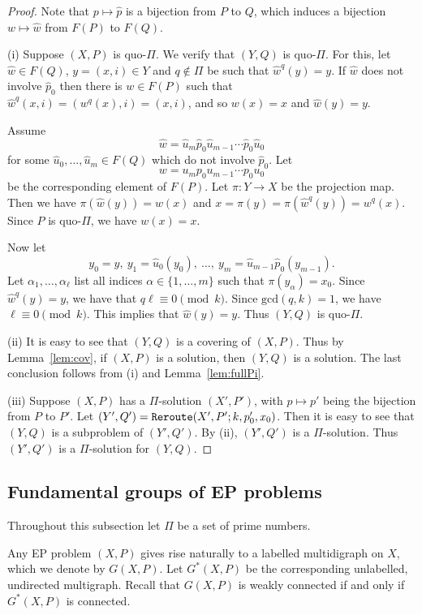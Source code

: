 \documentclass[10pt,a4paper]{amsart}
\theoremstyle{definition}
\theoremstyle{definition}
\numberwithin{equation}{section}
\begin{document}
\begin{proof} Note that $p\mapsto \hat{p}$ is a bijection from $P$ to $Q$, which induces a bijection $w\mapsto \hat{w}$ from $F(P)$ to $F(Q)$.  

(i) Suppose $(X, P)$ is quo-$\Pi$. We verify that $(Y, Q)$ is quo-$\Pi$. For this, let $\hat{w}\in F(Q)$, $y=(x,i)\in Y$ and $q\not\in \Pi$ be such that $\hat{w}^q(y)=y$. If $\hat{w}$ does not involve $\hat{p}_0$ then there is $w\in F(P)$ such that $\hat{w}^q(x,i)=(w^q(x),i)=(x,i)$, and so $w(x)=x$ and $\hat{w}(y)=y$. 

Assume 
$$ \hat{w}=\hat{u}_m \hat{p}_0 \hat{u}_{m-1} \cdots\hat{p}_0\hat{u}_0 $$
for some $\hat{u}_0,\dots, \hat{u}_m\in F(Q)$ which do not involve $\hat{p}_0$. Let
$$ w=u_mp_0u_{m-1}\cdots p_0u_0 $$
be the corresponding element of $F(P)$. Let $\pi\colon Y\to X$ be the projection map. Then we have $\pi(\hat{w}(y))=w(x)$ and $x=\pi(y)=\pi(\hat{w}^q(y))=w^q(x)$. Since $P$ is quo-$\Pi$, we have $w(x)=x$. 

Now let
$$y_0=y,\ y_1=\hat{u}_0(y_0),\ \dots,\ y_m=\hat{u}_{m-1}\hat{p}_0(y_{m-1}).$$
Let $\alpha_1, \dots, \alpha_\ell$ list all indices $\alpha\in\{1, \dots, m\}$ such that $\pi(y_\alpha)=x_0$. Since $\hat{w}^q(y)=y$, we have that $q\ell\equiv 0\pmod{k}$. Since $\mbox{gcd}(q,k)=1$, we have $\ell\equiv 0\pmod{k}$. This implies that $\hat{w}(y)=y$. Thus $(Y, Q)$ is quo-$\Pi$.

(ii) It is easy to see that $(Y,Q)$ is a covering of $(X, P)$. Thus by Lemma~\ref{lem:cov}, if $(X, P)$ is a solution, then $(Y, Q)$ is a solution. The last conclusion follows from (i) and Lemma~\ref{lem:fullPi}.

(iii) Suppose $(X, P)$ has a $\Pi$-solution $(X', P')$, with $p\mapsto p'$ being the bijection from $P$ to $P'$. Let $(Y', Q')=\mbox{\tt Reroute}(X', P'; k, p_0', x_0)$. Then it is easy to see that $(Y, Q)$ is a subproblem of $(Y', Q')$. By (ii), $(Y', Q')$ is a $\Pi$-solution. Thus $(Y', Q')$ is a $\Pi$-solution for $(Y, Q)$.
\end{proof}






\subsection{Fundamental groups of EP problems\label{subsec:fundamentalgroup}} Throughout this subsection let $\Pi$ be a set of prime numbers.

Any EP problem $(X, P)$ gives rise naturally to a labelled multidigraph on $X$, which we denote by $G(X, P)$. Let $G^*(X, P)$ be the corresponding unlabelled, undirected multigraph. Recall that $G(X, P)$ is weakly connected if and only if $G^*(X, P)$ is connected. 
\end{document}
